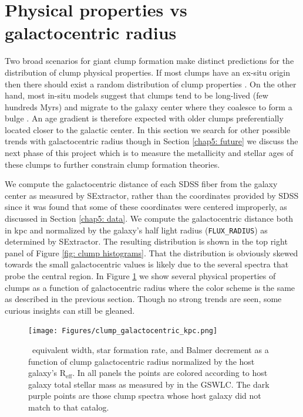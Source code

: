\section{Physical properties vs galactocentric radius}
\label{chap5: galactocentric radius}

Two broad scenarios for giant clump formation make distinct predictions for the distribution of clump physical properties. If most clumps have an ex-situ origin then there should exist a random distribution of clump properties \citep{Bournaud2008,WuFoSch2012}. On the other hand, most in-situ models suggest that clumps tend to be long-lived (few hundreds Myrs) and migrate to the galaxy center where they coalesce to form a bulge \citep{Bournaud2016}. An age gradient is therefore expected with older clumps preferentially located closer to the galactic center. In this section we search for other possible trends with galactocentric radius though in Section \ref{chap5: future} we discuss the next phase of this project which is to measure the metallicity and stellar ages of these clumps to further constrain clump formation theories. 


We compute the galactocentric distance of each SDSS fiber from the galaxy center as measured by SExtractor, rather than the coordinates provided by SDSS since it was found  that some of these coordinates were centered improperly, as discussed in Section \ref{chap5: data}. We compute the galactocentric distance both in kpc and normalized by the galaxy's half light radius (\texttt{FLUX\_RADIUS}) as determined by SExtractor. The resulting distribution is shown in the top right panel of Figure \ref{fig: clump histograms}. That the distribution is obviously skewed towards the small galactocentric values is likely due to the several spectra that probe the central region. In Figure \ref{fig: galactocentric radius relations} we show several physical properties of clumps as a function of galactocentric radius where the color scheme is the same as described in the previous section. Though no strong trends are seen, some curious insights can still be gleaned.
  

\begin{figure}
\texttt{[image: Figures/clump\_galactocentric\_kpc.png]}
\caption[\ha~EW, SFR, Balmer decrement as a function of clump galactocentric radius.]{\ha~equivalent width, star formation rate, and Balmer decrement as a function of clump galactocentric radius normalized by the host galaxy's R$_{\mathrm{eff}}$. In all panels the points are colored according to host galaxy total stellar mass as measured by \cite{Salim2016} in the GSWLC. The dark purple points are those clump spectra whose host galaxy did not match to that catalog.}
\label{fig: galactocentric radius relations}
\end{figure}


